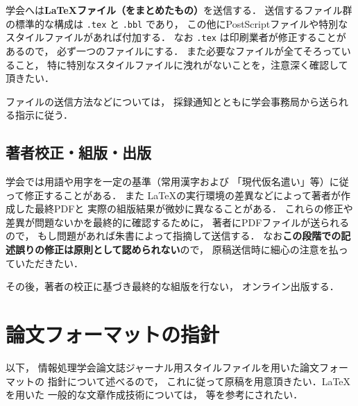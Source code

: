 \documentclass[submit]{ipsj}
\def\|{\verb|}
\begin{document}
学会へは{\bf \LaTeX ファイル（をまとめたもの）}を送信する．
送信するファイル群の標準的な構成は \|.tex| と \|.bbl| であり，
この他にPostScriptファイルや特別なスタイルファイルがあれば付加する．
なお \|.tex| は印刷業者が修正することがあるので，
{必ず一つのファイルにする}．
また必要なファイルが全てそろっていること，
特に特別なスタイルファイルに洩れがないことを，注意深く確認して頂きたい．


ファイルの送信方法などについては，
採録通知とともに学会事務局から送られる指示に従う．




\subsection{著者校正・組版・出版}


学会では用語や用字を一定の基準（常用漢字および
「現代仮名遣い」等）に従って修正することがある．
また \LaTeX の実行環境の差異などによって著者が作成した最終PDFと
実際の組版結果が微妙に異なることがある．
これらの修正や差異が問題ないかを最終的に確認するために，
著者にPDFファイルが送られるので，
もし問題があれば朱書によって指摘して送信する．
なお{\bf この段階での記述誤りの修正は原則として認められない}ので，
原稿送信時に細心の注意を払っていただきたい．


その後，著者の校正に基づき最終的な組版を行ない，
オンライン出版する．




\section{論文フォーマットの指針}
\label{sec:format}

以下，
情報処理学会論文誌ジャーナル用スタイルファイルを用いた論文フォーマットの
指針について述べるので，
これに従って原稿を用意頂きたい．\LaTeX を用いた
一般的な文章作成技術については，\cite{okumura} 等を参考にされたい．








\end{document}
